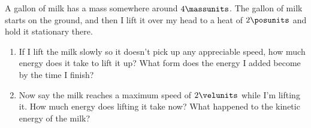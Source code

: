 A gallon of milk has a mass somewhere around $4\massunits$. The gallon of milk starts on the ground, and then I lift it over my head to a heat of $2\posunits$ and hold it stationary there.
\setcounter{equation}{0}
\begin{enumerate}
\ifsolution
\else
\setlength\itemsep{7cm}
\fi

\item If I lift the milk slowly so it doesn't pick up any appreciable speed, how much energy does it take to lift it up? What form does the energy I added become by the time I finish?

\item Now say the milk reaches a maximum speed of $2\velunits$ while I'm lifting it. How much energy does lifting it take now? What happened to the kinetic energy of the milk?

\end{enumerate}
